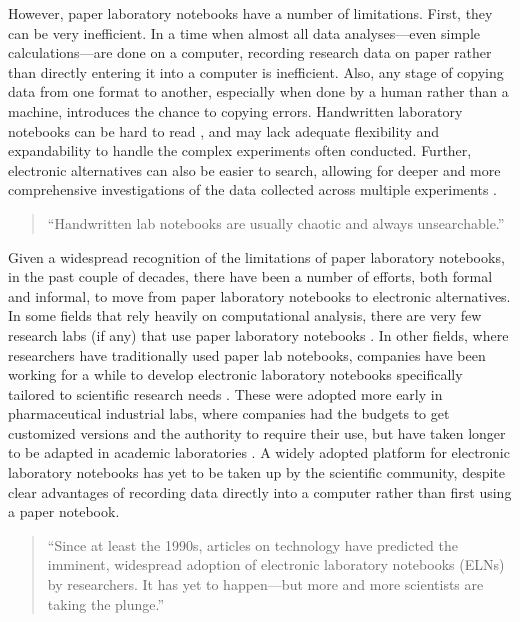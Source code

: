 \documentclass[]{tufte-book}
\begin{document}
However, paper laboratory notebooks have a number of limitations. First, they
can be very inefficient. In a time when almost all data analyses---even simple
calculations---are done on a computer, recording research data on paper rather
than directly entering it into a computer is inefficient. Also, any stage of
copying data from one format to another, especially when done by a human rather
than a machine, introduces the chance to copying errors. Handwritten laboratory
notebooks can be hard to read \citep{butler2005electronic, perkel2011coding}, and
may lack adequate flexibility and expandability to handle the complex
experiments often conducted. Further, electronic alternatives can also be easier
to search, allowing for deeper and more comprehensive investigations of the data
collected across multiple experiments \citep{giles2012digital, butler2005electronic, perkel2011coding}.

\begin{quote}
``Handwritten lab notebooks are usually chaotic and always unsearchable.''
\citep{perkel2011coding}
\end{quote}

Given a widespread recognition of the limitations of paper laboratory notebooks,
in the past couple of decades, there have been a number of efforts, both formal
and informal, to move from paper laboratory notebooks to electronic
alternatives. In some fields that rely heavily on computational analysis, there
are very few research labs (if any) that use paper laboratory notebooks
\citep{butler2005electronic}. In other fields, where researchers have traditionally
used paper lab notebooks, companies have been working for a while to develop
electronic laboratory notebooks specifically tailored to scientific research
needs \citep{giles2012digital}. These were adopted more early in pharmaceutical
industrial labs, where companies had the budgets to get customized versions and
the authority to require their use, but have taken longer to be adapted in
academic laboratories \citep{giles2012digital, butler2005electronic}. A widely
adopted platform for electronic laboratory notebooks has yet to be taken up
by the scientific community, despite clear advantages of recording data directly
into a computer rather than first using a paper notebook.

\begin{quote}
``Since at least the 1990s, articles on technology have predicted the imminent,
widespread adoption of electronic laboratory notebooks (ELNs) by researchers. It has
yet to happen---but more and more scientists are taking the plunge.'' \citep{kwok2018lab}
\end{quote}
\end{document}
